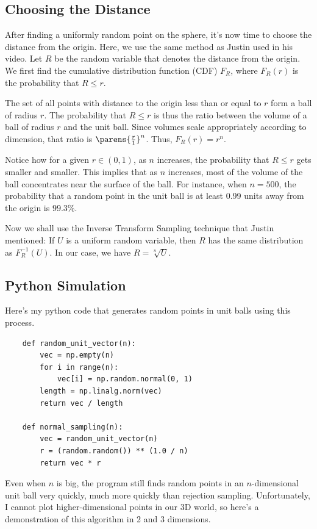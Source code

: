 \documentclass{article}
\begin{document}
\subsection{Choosing the Distance}

After finding a uniformly random point on the sphere, it's now time to choose the distance from the origin. Here, we use the same method as Justin used in his video. Let $R$ be the random variable that denotes the distance from the origin. We first find the cumulative distribution function (CDF) $F_R$, where $F_R(r)$ is the probability that $R \leq r$.

The set of all points with distance to the origin less than or equal to $r$ form a ball of radius $r$. The probability that $R \leq r$ is thus the ratio between the volume of a ball of radius $r$ and the unit ball. Since volumes scale appropriately according to dimension, that ratio is $\parens{\frac{r}{1}}^n$. Thus, $F_R(r) = r^n$.

Notice how for a given $r \in (0, 1)$, as $n$ increases, the probability that $R \leq r$ gets smaller and smaller. This implies that as $n$ increases, most of the volume of the ball concentrates near the surface of the ball. For instance, when $n = 500$, the probability that a random point in the unit ball is at least 0.99 units away from the origin is $99.3\%$.

Now we shall use the Inverse Transform Sampling technique that Justin mentioned: If $U$ is a uniform random variable, then $R$ has the same distribution as $F_R^{-1}(U)$. In our case, we have $R = \sqrt[n]{U}$.

\subsection{Python Simulation}

Here's my python code that generates random points in unit balls using this process.

\begin{verbatim}
    def random_unit_vector(n):
        vec = np.empty(n)
        for i in range(n):
            vec[i] = np.random.normal(0, 1)
        length = np.linalg.norm(vec)
        return vec / length
    
    def normal_sampling(n):
        vec = random_unit_vector(n)
        r = (random.random()) ** (1.0 / n)
        return vec * r
\end{verbatim}

Even when $n$ is big, the program still finds random points in an $n$-dimensional unit ball very quickly, much more quickly than rejection sampling. Unfortunately, I cannot plot higher-dimensional points in our 3D world, so here's a demonstration of this algorithm in 2 and 3 dimensions.
\end{document}

